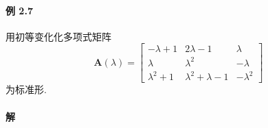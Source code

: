 \paragraph*{例 2.7} 用初等变化化多项式矩阵
$$
    \bm{A}(\lambda) = \begin{bmatrix}
        -\lambda + 1  & 2\lambda - 1            & \lambda    \\
        \lambda       & \lambda^2               & -\lambda   \\
        \lambda^2 + 1 & \lambda^2 + \lambda - 1 & -\lambda^2
    \end{bmatrix}
$$
为标准形.

\paragraph*{解}

